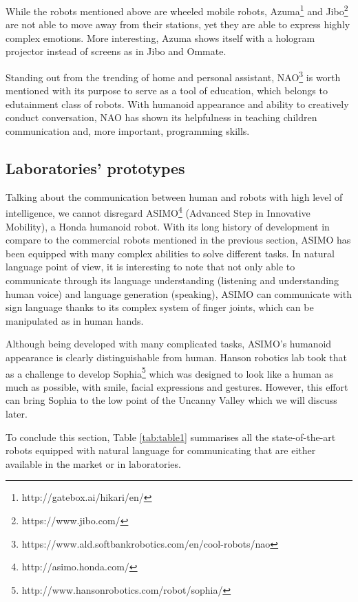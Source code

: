 \documentclass[10pt, a4paper]{article}
\begin{document}
While the robots mentioned above are wheeled mobile robots, Azuma\footnote{http://gatebox.ai/hikari/en/} and Jibo\footnote{https://www.jibo.com/} are not able to move away from their stations, yet they are able to express highly complex emotions. More interesting, Azuma shows itself with a hologram projector instead of screens as in Jibo and Ommate.

Standing out from the trending of home and personal assistant, NAO\footnote{https://www.ald.softbankrobotics.com/en/cool-robots/nao} is worth mentioned with its purpose to serve as a tool of education, which belongs to edutainment class of robots. With humanoid appearance and ability to creatively conduct conversation, NAO has shown its helpfulness in teaching children communication and, more important, programming skills.

\subsection{Laboratories' prototypes}
Talking about the communication between human and robots with high level of intelligence, we cannot disregard ASIMO\footnote{http://asimo.honda.com/} (Advanced Step in Innovative Mobility), a Honda humanoid robot.  With its long history of development in compare to the commercial robots mentioned in the previous section, ASIMO has been equipped with many complex abilities to solve different tasks. In natural language point of view, it is interesting to note that not only able to communicate through its language understanding (listening and understanding human voice) and language generation (speaking), ASIMO can communicate with sign language thanks to its complex system of finger joints, which can be manipulated as in human hands.

Although being developed with many complicated tasks, ASIMO's humanoid appearance is clearly distinguishable from human. Hanson robotics lab took that as a challenge to develop Sophia\footnote{http://www.hansonrobotics.com/robot/sophia/} which was designed to look like a human as much as possible, with smile, facial expressions and gestures. However, this effort can bring Sophia to the low point of the Uncanny Valley \cite{mori2012uncanny} which we will discuss later.

To conclude this section, Table \ref{tab:table1} summarises all the state-of-the-art robots equipped with natural language for communicating that are either available in the market or in laboratories.
\end{document}
